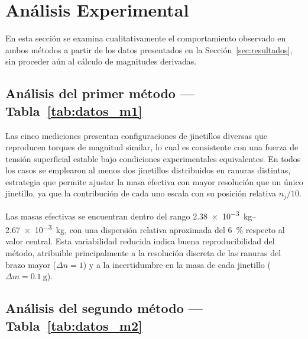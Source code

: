 
\section{Análisis Experimental}
\label{sec:analisis_exp}

En esta sección se examina cualitativamente el comportamiento observado
en ambos métodos a partir de los datos presentados en la
Sección~\ref{sec:resultados}, sin proceder aún al cálculo de magnitudes
derivadas.

\subsection{Análisis del primer método --- Tabla~\ref{tab:datos_m1}}

Las cinco mediciones presentan configuraciones de jinetillos diversas
que reproducen torques de magnitud similar, lo cual es consistente con
una fuerza de tensión superficial estable bajo condiciones experimentales
equivalentes. En todos los casos se emplearon al menos dos jinetillos
distribuidos en ranuras distintas, estrategia que permite ajustar la
masa efectiva con mayor resolución que un único jinetillo, ya que la
contribución de cada uno escala con su posición relativa $n_j/10$.

Las masas efectivas se encuentran dentro del rango
\qtyrange{2.38e-3}{2.67e-3}{\kilogram}, con una dispersión relativa
aproximada del \qty{6}{\percent} respecto al valor central. Esta
variabilidad reducida indica buena reproducibilidad del método,
atribuible principalmente a la resolución discreta de las ranuras del
brazo mayor ($\Delta n = 1$) y a la incertidumbre en la masa de cada
jinetillo ($\Delta m = \qty{0.1}{\gram}$).

\subsection{Análisis del segundo método --- Tabla~\ref{tab:datos_m2}}

